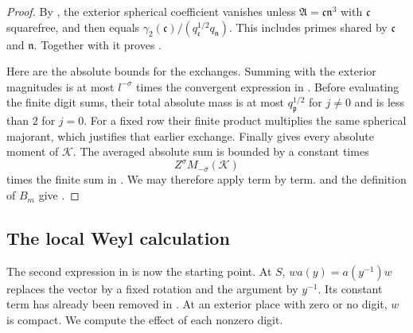 \begin{proof}
By , the exterior spherical
coefficient vanishes unless \(\mathfrak A=\mathfrak c\mathfrak n^3\)
with \(\mathfrak c\) squarefree, and then equals
\(\gamma_2(\mathfrak c)/(q_{\mathfrak c}^{1/2}q_{\mathfrak n})\).
This includes primes shared by \(\mathfrak c\) and \(\mathfrak n\).
Together with  it proves
.

Here are the absolute bounds for the exchanges.  Summing
 with the exterior magnitudes is at
most \(l^{-\sigma}\) times the convergent expression in
.  Before evaluating
the finite digit sums, their total absolute mass is at most
\(q_{\mathfrak p}^{1/2}\) for \(j\ne0\) and is less than \(2\) for \(j=0\).
For a fixed row their finite product multiplies the same spherical
majorant, which justifies that earlier exchange.  Finally
 gives every absolute moment of \(\mathcal K\).
The averaged absolute sum is bounded by a constant times
\[
 Z^\sigma M_{-\sigma}(\mathcal K)
\]
times the finite sum in .
We may therefore apply  term by term.
 and the
definition of \(B_m\) give .
\end{proof}

\subsection{The local Weyl calculation}

The second expression in  is now the
starting point.  At \(S\), \(wa(y)=a(y^{-1})w\) replaces the vector by a
fixed rotation and the argument by \(y^{-1}\).  Its constant term has
already been removed in .
At an exterior place with zero or no digit, \(w\) is compact.  We compute
the effect of each nonzero digit.

